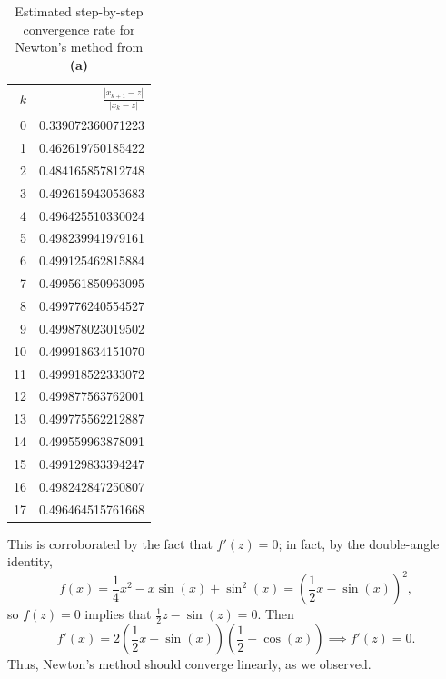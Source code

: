 \documentclass[newpage]{homework}
\begin{document}
\begin{alphaparts}
	\begin{table}[htb!]
		\centering
		\begin{tabular}{@{}rr@{}}
			\toprule
			$k$ & $\frac{|x_{k+1} - z|}{|x_k - z|}$ \\
			\midrule
			0 & 0.339072360071223 \\
			1 & 0.462619750185422 \\
			2 & 0.484165857812748 \\
			3 & 0.492615943053683 \\
			4 & 0.496425510330024 \\
			5 & 0.498239941979161 \\
			6 & 0.499125462815884 \\
			7 & 0.499561850963095 \\
			8 & 0.499776240554527 \\
			9 & 0.499878023019502 \\
			10 & 0.499918634151070 \\
			11 & 0.499918522333072 \\
			12 & 0.499877563762001 \\
			13 & 0.499775562212887 \\
			14 & 0.499559963878091 \\
			15 & 0.499129833394247 \\
			16 & 0.498242847250807 \\
			17 & 0.496464515761668 \\
			\bottomrule
		\end{tabular}
		\caption{Estimated step-by-step convergence rate for Newton's method from \textbf{(a)}}
		\label{table:problem3b}
	\end{table}
	
	This is corroborated by the fact that $f'(z) = 0$; in fact, by the double-angle identity,
	\begin{equation*}
		f(x) = \frac{1}{4}x^2 -x\sin(x) + \sin^2(x) = \left(\frac{1}{2}x - \sin(x)\right)^2,
	\end{equation*}
	so $f(z) = 0$ implies that $\frac{1}{2}z - \sin(z) = 0$. Then
	\begin{equation*}
		f'(x) = 2\left(\frac{1}{2}x - \sin(x)\right)\left(\frac{1}{2} - \cos(x)\right) \implies f'(z) = 0.
	\end{equation*}
	Thus, Newton's method should converge linearly, as we observed.
	

\end{alphaparts}
\end{document}
